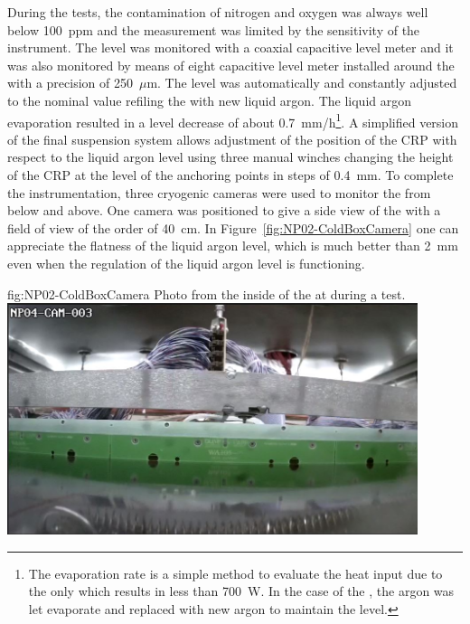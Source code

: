 During the tests, the contamination of nitrogen and oxygen was always well below 100~ppm and the measurement was limited by the sensitivity of the instrument.
The level was monitored with a coaxial capacitive level meter and it was also monitored by means of eight capacitive level meter installed around the  with a precision of 250~$\mu$m.
The level was automatically and constantly adjusted to the nominal value refiling the  \coldbox with new liquid argon.
The liquid argon evaporation resulted in a level decrease of about 0.7~mm/h\footnote{The evaporation rate is a simple method to evaluate the heat input due to the  \coldbox only which results in less than 700~W. In the case of the   \coldbox, the argon was let evaporate and replaced with new argon to maintain the level.}.
A simplified version of the  final suspension system allows adjustment of the position of the CRP with respect to the liquid argon level using three manual winches changing the height of the CRP at the level of the anchoring points in steps of 0.4~mm.
To complete the  \coldbox instrumentation, three cryogenic cameras were used to monitor the  from below and above.
One camera was positioned to give a side view of the  with a field of view of the order of 40~cm.
In Figure~\ref{fig:NP02-ColdBoxCamera} one can appreciate the flatness of the liquid argon level, which is much better than 2~mm even when the regulation of the liquid argon level is functioning.
\begin{dunefigure}{fig:NP02-ColdBoxCamera}
{Photo from the inside of the  \coldbox at  during a  test.}
\includegraphics[width=0.9\textwidth]{graphics/NP02-ColdBoxCamera.jpg}
\end{dunefigure}



